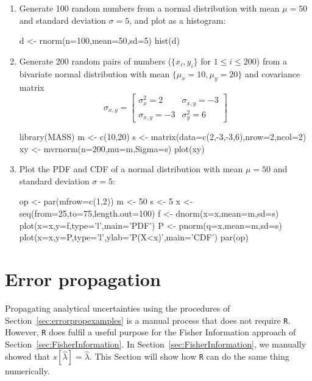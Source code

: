 \begin{enumerate}
  \item Generate 100 random numbers from a normal distribution with
    mean $\mu=50$ and standard deviation $\sigma=5$, and plot as a
    histogram:

\begin{script}
d <- rnorm(n=100,mean=50,sd=5)
hist(d)  
\end{script}

\item Generate 200 random pairs of numbers ($\{x_i,y_i\}$ for
  $1\leq{i}\leq{200}$) from a bivariate normal distribution with mean
  $\{\mu_x=10,\mu_y=20\}$ and covariance matrix
  \[
  \sigma_{x,y} = \left[
    \begin{array}{cc}
      \sigma_x^2 = 2 & \sigma_{x,y} = -3 \\
      \sigma_{x,y} = -3 & \sigma_y^2 = 6
    \end{array}
    \right]
  \]

\begin{script}
library(MASS)
m <- c(10,20)
s <- matrix(data=c(2,-3,-3,6),nrow=2,ncol=2)
xy <- mvrnorm(n=200,mu=m,Sigma=s)
plot(xy)
\end{script}

\item Plot the PDF and CDF of a normal distribution with mean $\mu=50$
  and standard deviation $\sigma=5$:

\begin{script}
op <- par(mfrow=c(1,2))
m <- 50
s <- 5
x <- seq(from=25,to=75,length.out=100)
f <- dnorm(x=x,mean=m,sd=s)
plot(x=x,y=f,type='l',main='PDF')
P <- pnorm(q=x,mean=m,sd=s) 
plot(x=x,y=P,type='l',ylab='P(X<x)',main='CDF')
par(op)
\end{script}

\end{enumerate}

\section{Error propagation}
\label{sec:R-errorprop}

Propagating analytical uncertainties using the procedures of
Section~\ref{sec:errorpropexamples} is a manual process that does not
require \texttt{R}. However, \texttt{R} does fulfil a useful purpose
for the Fisher Information approach of
Section~\ref{sec:FisherInformation}. In
Section~\ref{sec:FisherInformation}, we manually showed that
$s[\hat{\lambda}] = \hat{\lambda}$. This Section will show how
\texttt{R} can do the same thing numerically.

